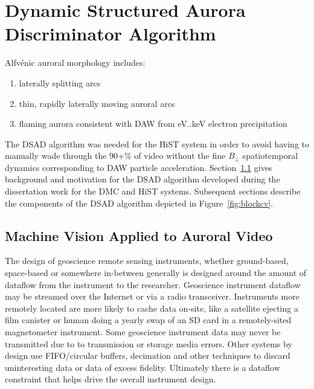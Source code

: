 \section{Dynamic Structured Aurora Discriminator Algorithm}\label{sec:discalgo}

Alfvénic auroral morphology includes:
\begin{enumerate}
    \item laterally splitting arcs
    \item thin, rapidly laterally moving auroral arcs
    \item flaming aurora consistent with DAW from \unit[100]{eV}..\unit[10]{keV} electron precipitation
\end{enumerate}
The DSAD algorithm was needed for the HiST system in order to avoid having to manually wade through the 90+\% of video without the fine $B_\perp$ spatiotemporal dynamics corresponding to DAW particle acceleration.
Section~\ref{sec:cvmot} gives background and motivation for the DSAD algorithm developed during the dissertation work for the DMC and HiST systems.
Subsequent sections describe the components of the DSAD algorithm depicted in Figure~\ref{fig:blockcv}.


\subsection{Machine Vision Applied to Auroral Video}\label{sec:cvmot}
The design of geoscience remote sensing instruments, whether ground-based, space-based or somewhere in-between generally is designed around the amount of dataflow from the instrument to the researcher.
Geoscience instrument dataflow may be streamed over the Internet or via a radio transceiver.
Instruments more remotely located are more likely to cache data on-site, like a satellite ejecting a film canister \citep{nageswararao2009} or human doing a yearly swap of an SD card in a remotely-sited magnetometer instrument.
Some geoscience instrument data may never be transmitted due to to transmission or storage media errors.
Other systems by design use FIFO/circular buffers, decimation and other techniques to discard uninteresting data or data of excess fidelity.
Ultimately there is a dataflow constraint that helps drive the overall instrument design.

